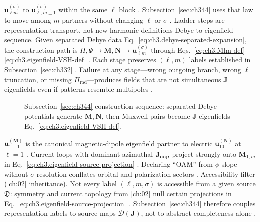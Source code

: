 \(\mathbf{u}_{\ell m}^{(\sigma)}\) to \(\mathbf{u}_{\ell,m\pm1}^{(\sigma)}\) within the same \(\ell\) block
. Subsection~\ref{sec:ch344} uses that law to move among \(m\) partners without changing
\(\ell\) or \(\sigma\) . Ladder steps are representation transport, not new harmonic definitions
Debye-to-eigenfield sequence. Given separated Debye data Eq.~\eqref{eq:ch3.debye-separated-expansion}, the construction path is
\(\Pi,\Psi\to\mathbf{M},\mathbf{N}\to\mathbf{u}_{\ell m}^{(\sigma)}\) through
Eqs.~\eqref{eq:ch3.Mlm-def}--\eqref{eq:ch3.eigenfield-VSH-def} . Each stage preserves
\((\ell,m)\) labels established in Subsection~\ref{sec:ch332} . Failure at any stage---wrong
outgoing branch, wrong \(\ell\) truncation, or missing \(\Pi_{\mathrm{rad}}\)---produces fields that are not
simultaneous \(\mathbf{J}\) eigenfields even if patterns resemble multipoles .
\begin{figure}[t]
\centering
{}
\caption{Subsection~\ref{sec:ch344} construction sequence: separated Debye potentials generate \(\mathbf{M},\mathbf{N}\),
then Maxwell pairs become \(\mathbf{J}\) eigenfields Eq.~\eqref{eq:ch3.eigenfield-VSH-def}.}
\label{fig:ch3.344-debye-eigenfield-pipeline}
\end{figure}
\(\mathbf{u}_{1,-1}^{(\mathbf{M})}\) is the canonical magnetic-dipole eigenfield partner to electric
\(\mathbf{u}_{10}^{(\mathbf{N})}\) at \(\ell=1\) . Current loops with dominant azimuthal
\(\mathbf{J}_{\mathrm{imp}}\) project strongly onto \(\mathbf{M}_{1,m}\) in Eq.~\eqref{eq:ch3.eigenfield-source-projection}
. Declaring ``OAM'' from \(\phi\) slope without \(\sigma\) resolution conflates orbital
and polarization sectors .
Accessibility filter (\ref{ch:02} inheritance). Not every label \((\ell,m,\sigma)\) is accessible from a given source \(\mathfrak{D}\): symmetry and current topology
from \ref{ch:02} null certain projections in Eq.~\eqref{eq:ch3.eigenfield-source-projection}
. Subsection~\ref{sec:ch344} therefore couples representation labels to source
maps \(\mathcal{D}(\mathbf{J})\), not to abstract completeness alone .
